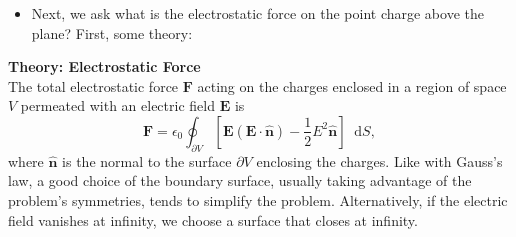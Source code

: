 \documentclass[11pt, a4paper]{article}
\newcommand{\diff}{\mathop{}\!\mathrm{d}} %
\renewcommand{\vec}[1]{\bm{#1}} %
\newcommand{\uvec}[1]{\hat{\vec{#1}}} %
\newcommand{\E}{\vec{E}}  %
\newcommand{\ee}{\epsilon_{0}}  %
\begin{document}
\begin{itemize}
	\item Next, we ask what is the electrostatic force on the point charge above the plane? First, some theory:
\end{itemize}  
\textbf{Theory: Electrostatic Force}\\[2mm]
The total electrostatic force $ \vec{F} $ acting on the charges enclosed in a region of space $ V $ permeated with an electric field $ \E $ is
\begin{equation*}
	\vec{F} = \ee \oint_{\partial V} \left[\E(\E \cdot \uvec{n}) - \frac{1}{2}E^{2}\uvec{n}\right]\diff S,
\end{equation*}
where $ \uvec{n} $ is the normal to the surface $ \partial V $ enclosing the charges. Like with Gauss's law, a good choice of the boundary surface, usually taking advantage of the problem's symmetries, tends to simplify the problem. Alternatively, if the electric field vanishes at infinity, we choose a surface that closes at infinity. 
\end{document}
